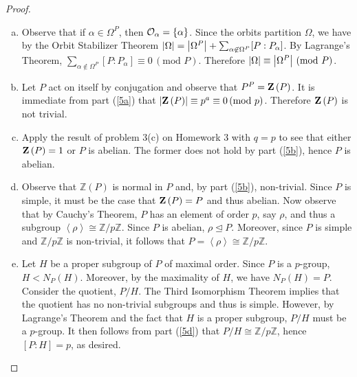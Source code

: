 \documentclass[10pt]{amsart}
\begin{document}
\begin{thm}
  
  \begin{proof}
    \begin{enumerate}[(a)]
      \item\label{5a}
        Observe that if $\alpha \in \Omega^P$, then $\mathcal{O}_{\alpha} = \left\{\alpha\right\}$.
        Since the orbits partition $\Omega$, we have by the Orbit Stabilizer Theorem $\left| \Omega \right| = \left| \Omega^P \right| + \sum_{\alpha \not \in \Omega^P} [P : P_\alpha]$.
        By Lagrange's Theorem, $\sum_{\alpha \not \in \Omega^P} [P : P_\alpha] \equiv 0\, (\text{mod }P)$.
        Therefore $\left| \Omega \right| \equiv \left| \Omega^P \right|\, (\text{mod } P)$.
      \item\label{5b}
        Let $P$ act on itself by conjugation and observe that $P^P = \mathbf{Z}\left(P\right)$.
        It is immediate from part (\ref{5a}) that $\left| \mathbf{Z}\left(P\right) \right| \equiv p^a \equiv 0 \, (\text{mod } p)$.
        Therefore $\mathbf{Z}\left(P\right)$ is not trivial.
      \item\label{5c}
        Apply the result of problem 3(c) on Homework 3 with $q = p$ to see that either $\mathbf{Z}\left(P\right) = 1$ or $P$ is abelian.
        The former does not hold by part (\ref{5b}), hence $P$ is abelian.
      \item\label{5d}
        Observe that $\mathbb{Z}(P)$ is normal in $P$ and, by part (\ref{5b}), non-trivial.
        Since $P$ is simple, it must be the case that $\mathbf{Z}\left(P\right) = P$ and thus abelian.
        Now observe that by Cauchy's Theorem, $P$ has an element of order $p$, say $\rho$, and thus a subgroup $\left<\rho\right> \cong \mathbb{Z}/p\mathbb{Z}$.
        Since $P$ is abelian, $\rho \unlhd P$.
        Moreover, since $P$ is simple and $\mathbb{Z}/p\mathbb{Z}$ is non-trivial, it follows that  $P = \left<\rho\right> \cong \mathbb{Z}/p\mathbb{Z}$.
      \item\label{5e}
        Let $H$ be a proper subgroup of $P$ of maximal order.
        Since $P$ is a $p$-group, $H < N_P(H)$.
        Moreover, by the maximality of $H$, we have $N_P(H) = P$.
        Consider the quotient, $P/H$.
        The Third Isomorphism Theorem implies that the quotient has no non-trivial subgroups and thus is simple.
        However, by Lagrange's Theorem and the fact that $H$ is a proper subgroup, $P/H$ must be a $p$-group.
        It then follows from part (\ref{5d}) that $P/H \cong \mathbb{Z}/p\mathbb{Z}$, hence $[P:H] = p$, as desired. 
    \end{enumerate}
  \end{proof}
\end{thm}
\end{document}
